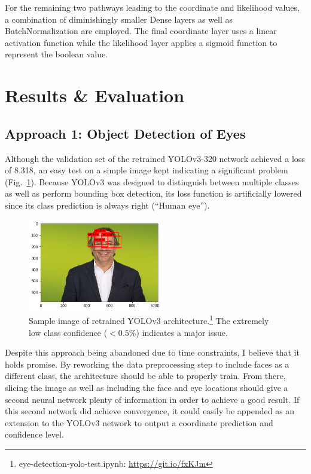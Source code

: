 \documentclass[aip, rsi, amsmath, amssymb, reprint, author-year, longbibliography]{revtex4-1}
\begin{document}
For the remaining two pathways leading to the coordinate and likelihood values,
a combination of diminishingly smaller Dense layers as well as
BatchNormalization are employed. The final coordinate layer uses a linear
activation function while the likelihood layer applies a sigmoid function to
represent the boolean value.

\section{\label{sec:level1}Results \& Evaluation}

\subsection{\label{sec:results} Approach 1: Object Detection of Eyes}

Although the validation set of the retrained YOLOv3-320 network achieved a loss
of 8.318, an easy test on a simple image kept indicating a significant problem
(Fig.~\ref{fig:yoloissue}). Because YOLOv3 was designed to distinguish between
multiple classes as well as perform bounding box detection, its loss function is
artificially lowered since its class prediction is always right (``Human eye'').

\begin{figure}
\includegraphics[height=4cm]{yolo-issue.png}
\caption{\label{fig:yoloissue} Sample image of retrained YOLOv3
  architecture.\footnote{eye-detection-yolo-test.ipynb:
    \url{https://git.io/fxKJm}} The extremely low class confidence ($< 0.5\%$)
  indicates a major issue.}
\end{figure}

Despite this approach being abandoned due to time constraints, I believe that it
holds promise. By reworking the data preprocessing step to include faces as a
different class, the architecture should be able to properly train. From there,
slicing the image as well as including the face and eye locations should give a
second neural network plenty of information in order to achieve a good result.
If this second network did achieve convergence, it could easily be appended as an
extension to the YOLOv3 network to output a coordinate prediction and confidence
level.
\end{document}
